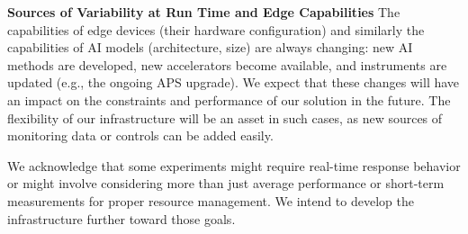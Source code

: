 

\textbf{Sources of Variability at Run Time and Edge Capabilities}
The capabilities of edge devices (their hardware configuration) and similarly the capabilities of AI models (architecture, size) are always changing: new AI methods are developed, new accelerators become available, and instruments are updated (e.g., the ongoing APS upgrade). We expect that these changes will have an impact on the constraints and performance of our solution in the future. The flexibility of our infrastructure will be an asset in such cases, as new sources
of monitoring data or controls can be added easily.


We acknowledge that some experiments might require real-time response
behavior or might involve considering more than just average performance or
short-term measurements for proper resource management. We intend to develop the
infrastructure further toward those goals.


